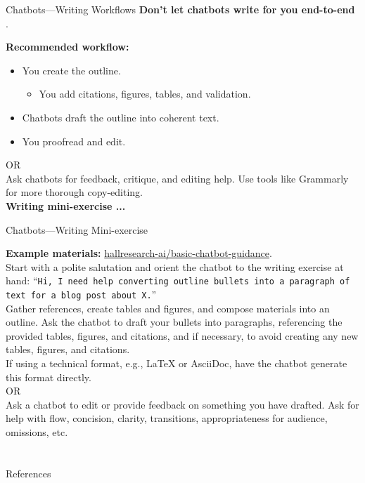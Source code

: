 \documentclass[aspectratio=169]{beamer}
\begin{document}
\begin{frame}[t]{Chatbots—Writing Workflows}
\textbf{Don’t let chatbots write for you end-to-end} \parencite{alkaissi2023artificial}.

\vspace{1em}

\textbf{Recommended workflow:}
\begin{itemize}
    \item You create the outline.
    \begin{itemize}
        \item You add citations, figures, tables, and validation.
    \end{itemize}
    \item Chatbots draft the outline into coherent text.
    \item You proofread and edit.\\
\end{itemize}
\vspace{5pt}
OR\\ 
\vspace{10pt}
Ask chatbots for feedback, critique, and editing help. Use tools like Grammarly for more thorough copy-editing.\\ 
\vspace{1em}
\textbf{Writing mini-exercise ...} 
\end{frame}

\begin{frame}{Chatbots—Writing Mini-exercise}

\footnotesize
\textbf{Example materials:} \href{https://github.com/hallresearch-ai/basic-chatbot-guidance/tree/main/model-doc-outline}{hallresearch-ai/basic-chatbot-guidance}. \\
\vspace{1em} 
Start with a polite salutation and orient the chatbot to the writing exercise at hand: ``\texttt{Hi, I need help converting outline bullets into a paragraph of text for a blog post about X.}''\\
\vspace{1em}
Gather references, create tables and figures, and compose materials into an outline. Ask the chatbot to draft your bullets into paragraphs, referencing the provided tables, figures, and citations, and if necessary, to avoid creating any new tables, figures, and citations. \\
\vspace{1em}
If using a technical format, e.g., LaTeX or AsciiDoc, have the chatbot generate this format directly.\\
\vspace{1em}
OR\\
\vspace{1em}
Ask a chatbot to edit or provide feedback on something you have drafted. Ask for help with flow, concision, clarity, transitions, appropriateness for audience, omissions, etc.\\

\end{frame}


\section*{}
{
\begin{frame}[t, allowframebreaks]{References}
  \printbibliography[heading=none]
\end{frame}
}
\end{document}
